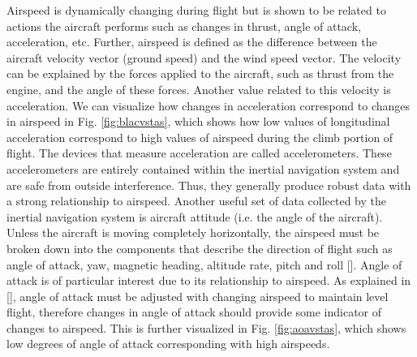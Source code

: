 \documentclass[]{aiaa-tc}
\begin{document}
Airspeed is dynamically changing during flight but is shown to be related to actions the aircraft performs such as changes in thrust, angle of attack, acceleration, etc. 
Further, airspeed is defined as the difference between the aircraft velocity vector (ground speed) and the wind speed vector. The velocity can be explained by the forces applied to the aircraft, such as thrust from the engine, and the angle of these forces. Another value related to this velocity is acceleration. We can visualize how changes in acceleration correspond to changes in airspeed in Fig. \ref{fig:blacvstas}, which shows how low values of longitudinal acceleration correspond to high values of airspeed during the climb portion of flight. The devices that measure acceleration are called accelerometers. These accelerometers are entirely contained within the inertial navigation system and are safe from outside interference. Thus, they generally produce robust data with a strong relationship to airspeed. Another useful set of data collected by the inertial navigation system is aircraft attitude (i.e. the angle of the aircraft). Unless the aircraft is moving completely horizontally, the airspeed must be broken down into the components that describe the direction of flight such as angle of attack, yaw, magnetic heading, altitude rate, pitch and roll []. Angle of attack is of particular interest due to its relationship to airspeed. As explained in [], angle of attack must be adjusted with changing airspeed to maintain level flight, therefore changes in angle of attack should provide some indicator of changes to airspeed. This is further visualized in Fig. \ref{fig:aoavstas}, which shows low degrees of angle of attack corresponding with high airspeeds. 
\end{document}
